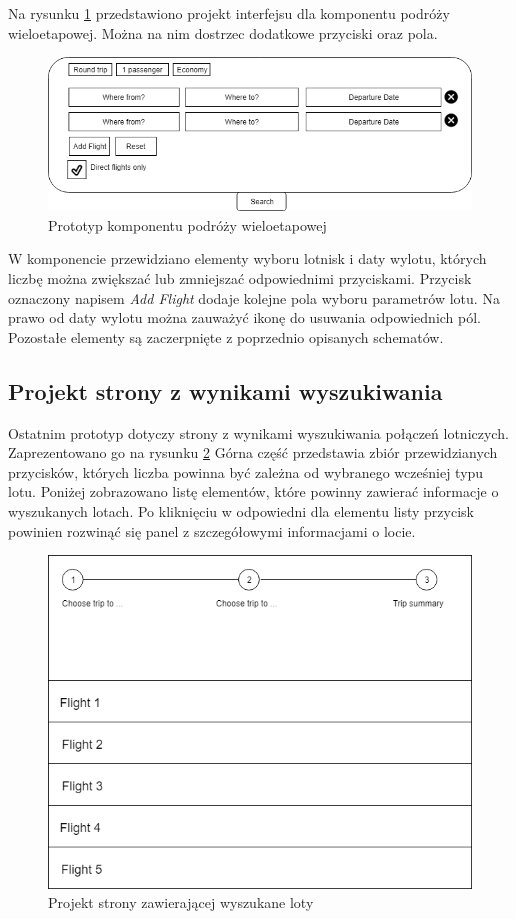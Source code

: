 \documentclass[12pt, twoside]{report}
\begin{document}
Na rysunku \ref{fig:multi_travel_interface} przedstawiono projekt interfejsu dla komponentu podróży wieloetapowej. Można na nim dostrzec dodatkowe przyciski oraz pola.
\begin{figure}[!ht]
\centering
\includegraphics[scale=0.60, keepaspectratio]{multi_travel_interface.PNG}
\caption{Prototyp komponentu podróży wieloetapowej}
\label{fig:multi_travel_interface}
\end{figure}
W komponencie przewidziano elementy wyboru lotnisk i daty wylotu, których liczbę można zwiększać lub zmniejszać odpowiednimi przyciskami. Przycisk oznaczony napisem \textit{Add Flight} dodaje kolejne pola wyboru parametrów lotu. Na prawo od daty wylotu można zauważyć ikonę do usuwania odpowiednich pól. Pozostałe elementy są zaczerpnięte z poprzednio opisanych schematów.
\subsection{Projekt strony z wynikami wyszukiwania}
Ostatnim prototyp dotyczy strony z wynikami wyszukiwania połączeń lotniczych. Zaprezentowano go na rysunku \ref{fig:result_interface} Górna część przedstawia zbiór przewidzianych przycisków, których liczba powinna być zależna od wybranego wcześniej typu lotu. Poniżej zobrazowano listę elementów, które powinny zawierać informacje o wyszukanych lotach. Po kliknięciu w odpowiedni dla elementu listy przycisk powinien rozwinąć się panel z szczegółowymi informacjami o locie.

\begin{figure}[!ht]
\centering
\includegraphics[scale=0.60, keepaspectratio]{result_interface.PNG}
\caption{Projekt strony zawierającej wyszukane loty}
\label{fig:result_interface}
\end{figure}
\end{document}
